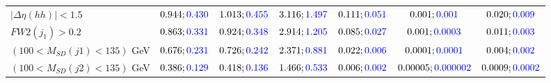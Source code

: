 \begin{landscape}
\begin{table}
\begin{tabular}{lcccccc}
				\rowcolor{black!7}$|\Delta\eta(hh)|<1.5$& $0.944;\textcolor{blue}{0.430}$&$1.013;\textcolor{blue}{0.455}$ &$3.116;\textcolor{blue}{1.497}$ &$0.111;\textcolor{blue}{0.051}$ &$0.001;\textcolor{blue}{0.001}$ &$0.020;\textcolor{blue}{0.009}$\\
				$FW2(j_1)>0.2$ &$0.863;\textcolor{blue}{0.331}$ &$0.924;\textcolor{blue}{0.348}$&$2.914;\textcolor{blue}{1.205}$&$0.085;\textcolor{blue}{0.027}$&$0.001;\textcolor{blue}{0.0003}$&$0.011;\textcolor{blue}{0.003}$\\
				\rowcolor{black!7}$(100<M_{SD}(j1)<135)$ GeV& $0.676;\textcolor{blue}{0.231}$&$0.726;\textcolor{blue}{0.242}$&$2.371;\textcolor{blue}{0.881}$&$0.022;\textcolor{blue}{0.006}$&$0.0001;\textcolor{blue}{0.0001}$&$0.004;\textcolor{blue}{0.002}$\\
				$(100<M_{SD}(j2)<135)$ GeV &$0.386;\textcolor{blue}{0.129}$ &$0.418;\textcolor{blue}{0.136}$ &$1.466;\textcolor{blue}{0.533}$&$0.006;\textcolor{blue}{0.002}$&$0.00005;\textcolor{blue}{0.000002}$&$0.0009;\textcolor{blue}{0.0002}$\\
				\bottomrule
			\end{tabular}
		\end{table}
		

\end{landscape}
